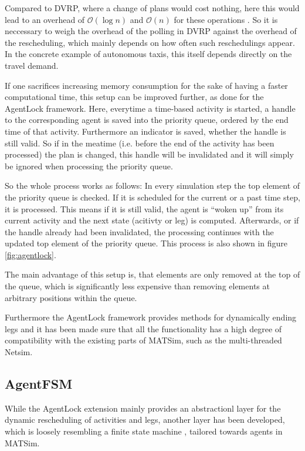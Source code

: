 Compared to DVRP, where a change of plans would cost nothing, here this would lead
to an overhead of $\mathcal{O}(\log n)$ and $\mathcal{O}(n)$ for these operations \citep{JavaPQ}.
So it is neccessary to weigh the overhead of the polling in DVRP against the overhead
of the rescheduling, which mainly depends on how often such reschedulings appear. In
the concrete example of autonomous taxis, this itself depends directly on the travel
demand.


If one sacrifices increasing memory consumption for the sake of having a faster
computational time, this setup can be improved further, as done for the AgentLock
framework. Here, everytime a time-based activity is started, a handle to the
corresponding agent is saved into the priority queue, ordered by the end time of
that activity. Furthermore an indicator is saved, whether the handle is still valid.
So if in the meatime (i.e. before the end of the activity has been processed) the
plan is changed, this handle will be invalidated and it will simply be ignored
when processing the priority queue.

So the whole process works as follows: In every simulation step the top element of
the priority queue is checked. If it is scheduled for the current or a past time
step, it is processed. This means if it is still valid, the agent is ``woken up''
from its current activity and the next state (acitivty or leg) is computed. Afterwards,
or if the handle already had been invalidated, the processing continues with the
updated top element of the priority queue. This process is also shown in figure
\cref{fig:agentlock}. 

The main advantage of this setup is, that elements are only removed at the top
of the queue, which is significantly less expensive than removing elements at
arbitrary positions within the queue.

Furthermore the AgentLock framework provides methods for dynamically ending legs
and it has been made sure that all the functionality has a high degree of compatibility
with the existing parts of MATSim, such as the multi-threaded Netsim.

\subsection{AgentFSM}

While the AgentLock extension mainly provides an abstractionl layer for the dynamic
rescheduling of activities and legs, another layer has been developed, which is
loosely resembling a finite state machine , tailored towards agents in
MATSim.

